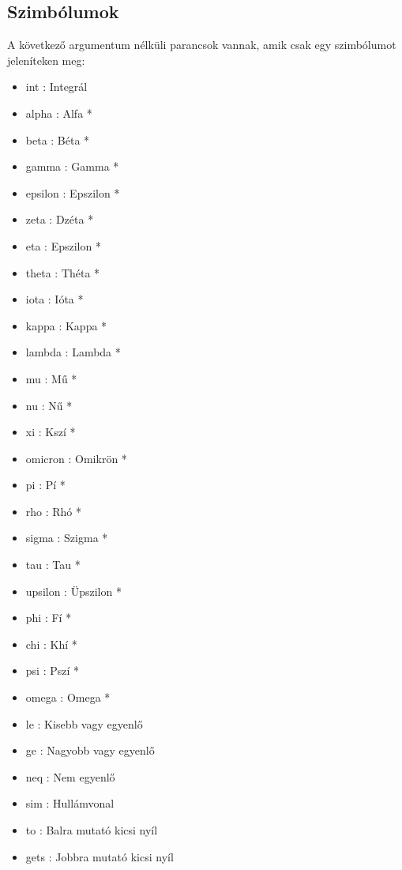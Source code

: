 \documentclass[../spec.tex]{subfiles}
\begin{document}
    \subsection{Szimbólumok}\label{subsec:szimbólumok}
    A következő argumentum nélküli parancsok vannak, amik csak egy szimbólumot jeleníteken meg:
    \begin{itemize}
        \item \tbs int : Integrál
        \item \tbs alpha : Alfa *
        \item \tbs beta : Béta *
        \item \tbs gamma : Gamma *
        \item \tbs epsilon : Epszilon *
        \item \tbs zeta : Dzéta *
        \item \tbs eta : Epszilon *
        \item \tbs theta : Théta *
        \item \tbs iota : Ióta *
        \item \tbs kappa : Kappa *
        \item \tbs lambda : Lambda *
        \item \tbs mu : Mű *
        \item \tbs nu : Nű *
        \item \tbs xi : Kszí *
        \item \tbs omicron : Omikrön *
        \item \tbs pi : Pí *
        \item \tbs rho : Rhó *
        \item \tbs sigma : Szigma *
        \item \tbs tau : Tau *
        \item \tbs upsilon : Üpszilon *
        \item \tbs phi : Fí *
        \item \tbs chi : Khí *
        \item \tbs psi : Pszí *
        \item \tbs omega : Omega *
        \item \tbs le : Kisebb vagy egyenlő
        \item \tbs ge : Nagyobb vagy egyenlő
        \item \tbs neq : Nem egyenlő
        \item \tbs sim : Hullámvonal
        \item \tbs to : Balra mutató kicsi nyíl
        \item \tbs gets : Jobbra mutató kicsi nyíl

\end{itemize}
\end{document}
